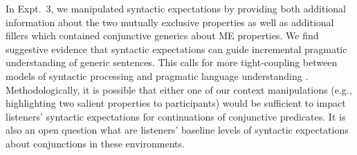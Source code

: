 \documentclass[10pt,letterpaper]{article}
\begin{document}
In Expt.~3, we manipulated syntactic expectations by providing both additional information about the two mutually exclusive properties as well as additional fillers which contained conjunctive generics about ME properties. 
We find suggestive evidence that syntactic expectations can guide incremental pragmatic understanding of generic sentences. 
This calls for more tight-coupling between models of syntactic processing \cite{Levy2008} and pragmatic language understanding \cite{Goodman2016}. 
Methodologically, it is possible that either one of our context manipulations (e.g., highlighting two salient properties to participants) would be sufficient to impact listeners' syntactic expectations for continuations of conjunctive predicates.
It is also an open question what are listeners' baseline levels of syntactic expectations about conjunctions in these environments. 






%




\setlength{\bibleftmargin}{.125in}
\setlength{\bibindent}{-\bibleftmargin}


\end{document}
